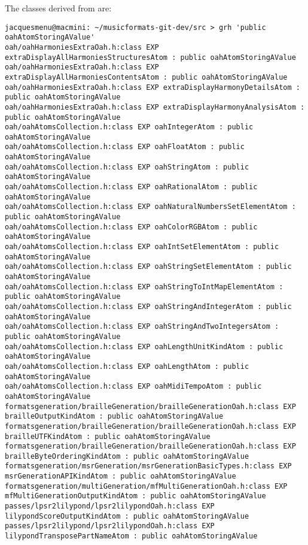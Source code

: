 The classes derived from  are:
\begin{lstlisting}[language=Terminal]
jacquesmenu@macmini: ~/musicformats-git-dev/src > grh 'public oahAtomStoringAValue'
oah/oahHarmoniesExtraOah.h:class EXP extraDisplayAllHarmoniesStructuresAtom : public oahAtomStoringAValue
oah/oahHarmoniesExtraOah.h:class EXP extraDisplayAllHarmoniesContentsAtom : public oahAtomStoringAValue
oah/oahHarmoniesExtraOah.h:class EXP extraDisplayHarmonyDetailsAtom : public oahAtomStoringAValue
oah/oahHarmoniesExtraOah.h:class EXP extraDisplayHarmonyAnalysisAtom : public oahAtomStoringAValue
oah/oahAtomsCollection.h:class EXP oahIntegerAtom : public oahAtomStoringAValue
oah/oahAtomsCollection.h:class EXP oahFloatAtom : public oahAtomStoringAValue
oah/oahAtomsCollection.h:class EXP oahStringAtom : public oahAtomStoringAValue
oah/oahAtomsCollection.h:class EXP oahRationalAtom : public oahAtomStoringAValue
oah/oahAtomsCollection.h:class EXP oahNaturalNumbersSetElementAtom : public oahAtomStoringAValue
oah/oahAtomsCollection.h:class EXP oahColorRGBAtom : public oahAtomStoringAValue
oah/oahAtomsCollection.h:class EXP oahIntSetElementAtom : public oahAtomStoringAValue
oah/oahAtomsCollection.h:class EXP oahStringSetElementAtom : public oahAtomStoringAValue
oah/oahAtomsCollection.h:class EXP oahStringToIntMapElementAtom : public oahAtomStoringAValue
oah/oahAtomsCollection.h:class EXP oahStringAndIntegerAtom : public oahAtomStoringAValue
oah/oahAtomsCollection.h:class EXP oahStringAndTwoIntegersAtom : public oahAtomStoringAValue
oah/oahAtomsCollection.h:class EXP oahLengthUnitKindAtom : public oahAtomStoringAValue
oah/oahAtomsCollection.h:class EXP oahLengthAtom : public oahAtomStoringAValue
oah/oahAtomsCollection.h:class EXP oahMidiTempoAtom : public oahAtomStoringAValue
formatsgeneration/brailleGeneration/brailleGenerationOah.h:class EXP brailleOutputKindAtom : public oahAtomStoringAValue
formatsgeneration/brailleGeneration/brailleGenerationOah.h:class EXP brailleUTFKindAtom : public oahAtomStoringAValue
formatsgeneration/brailleGeneration/brailleGenerationOah.h:class EXP brailleByteOrderingKindAtom : public oahAtomStoringAValue
formatsgeneration/msrGeneration/msrGenerationBasicTypes.h:class EXP msrGenerationAPIKindAtom : public oahAtomStoringAValue
formatsgeneration/multiGeneration/mfMultiGenerationOah.h:class EXP mfMultiGenerationOutputKindAtom : public oahAtomStoringAValue
passes/lpsr2lilypond/lpsr2lilypondOah.h:class EXP lilypondScoreOutputKindAtom : public oahAtomStoringAValue
passes/lpsr2lilypond/lpsr2lilypondOah.h:class EXP lilypondTransposePartNameAtom : public oahAtomStoringAValue

\end{lstlisting}
